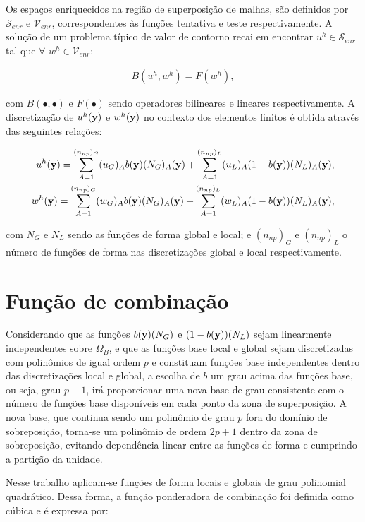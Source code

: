 Os espaços enriquecidos na região de superposição de malhas, são definidos por $\mathcal{S}_{enr}$ e $\mathcal{V}_{enr}$, correspondentes às funções tentativa e teste respectivamente. A solução de um problema típico de valor de contorno recai em encontrar $u^{h} \in \mathcal{S}_{enr}$ tal que $\forall$ $ w^{h} \in \mathcal{V}_{enr}$: 

\begin{align}
B(u^{h},w^{h}) = F(w^{h}),
\end{align}

\noindent com $B(\bullet,\bullet)$ e $F(\bullet)$ sendo operadores bilineares e lineares respectivamente. A discretização de $u^{h}(\mathbf{y})$ e $w^{h}(\mathbf{y})$ no contexto dos elementos finitos é obtida através das seguintes relações:

\begin{align}
u^{h}(\mathbf{y}) = \sum_{A = 1}^{(n_{np})_G} (u_{G})_{A}b(\mathbf{y})(N_{G})_{A}(\mathbf{y}) + \sum_{A = 1}^{(n_{np})_L} (u_{L})_{A}(1-b(\mathbf{y}))(N_{L})_{A}(\mathbf{y}),\label{eq:u_mod} \\ 
w^{h}(\mathbf{y}) = \sum_{A = 1}^{(n_{np})_G} (w_{G})_{A}b(\mathbf{y})(N_{G})_{A}(\mathbf{y}) + \sum_{A = 1}^{(n_{np})_L} (w_{L})_{A}(1-b(\mathbf{y}))(N_{L})_{A}(\mathbf{y}), \label{eq:w_mod}
\end{align}

\noindent com $N_{G}$ e $N_{L}$ sendo as funções de forma global e local; e $(n_{np})_G$ e $(n_{np})_L$ o número de funções de forma nas discretizações global e local respectivamente. 

\section{Função de combinação}

Considerando que as funções $b(\mathbf{y})(N_{G})$ e $(1-b(\mathbf{y}))(N_{L})$ sejam linearmente independentes sobre $\Omega_{B}$, e que as funções base local e global sejam discretizadas com polinômios de igual ordem $p$ e constituam funções base independentes dentro das discretizações local e global, a escolha de $b$ um grau acima das funções base, ou seja, grau $p+1$, irá proporcionar uma nova base de grau consistente com o número de funções base disponíveis em cada ponto da zona de superposição. A nova base, que continua sendo um polinômio de grau $p$ fora do domínio de sobreposição, torna-se um polinômio de ordem $2p+1$ dentro da zona de sobreposição, evitando dependência linear entre as funções de forma e cumprindo a partição da unidade.

Nesse trabalho aplicam-se funções de forma locais e globais de grau polinomial quadrático. Dessa forma, a função ponderadora de combinação foi definida como cúbica e é expressa por:

